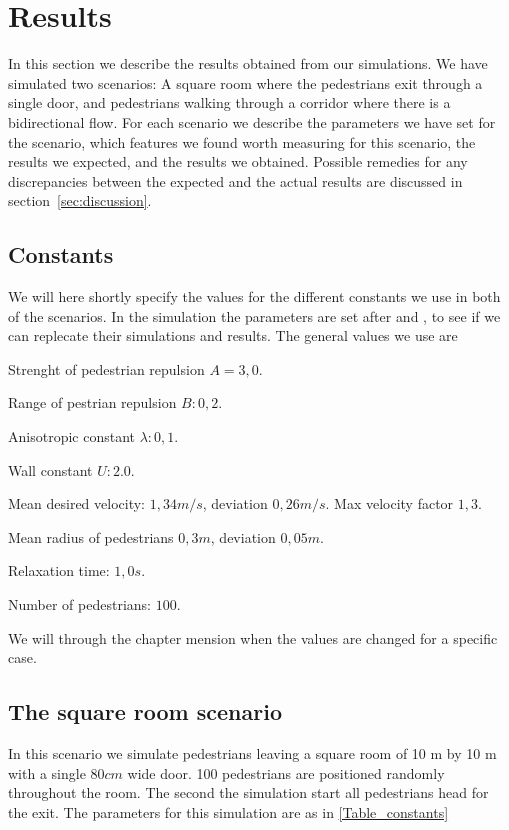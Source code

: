 \section{Results}
\label{sec:results}
In this section we describe the results obtained from our simulations. We have simulated two scenarios: A square room where the pedestrians exit through a single door, and pedestrians walking through a corridor where there is a bidirectional flow. For each scenario we describe the parameters we have set for the scenario, which features we found worth measuring for this scenario, the results we expected, and the results we obtained. Possible remedies for any discrepancies between the expected and the actual results are discussed in section~\ref{sec:discussion}.

\subsection{Constants}
We will here shortly specify the values for the different constants we use in both of the scenarios.
In the simulation the parameters are set after \cite{ABconstant} and \cite{self-org}, to see if we can replecate their simulations and results.
The general values we use are


\begin{itemize*}
    \item Strenght of pedestrian repulsion $A= 3,0$. 
    \item Range of pestrian repulsion $B: 0,2$.  
    \item Anisotropic constant $\lambda: 0,1$.
    \item Wall constant $U: 2.0$.
    \item Mean desired velocity: $1,34 m/s$, deviation $0,26 m/s$. Max velocity factor $1,3$.
    \item Mean radius of pedestrians $0,3 m$, deviation $0,05 m$.
    \item Relaxation time: $1,0 s$.
    \item Number of pedestrians: $100$.
\label{Table_constants}
\end{itemize*}

We will through the chapter mension when the values are changed for a specific case. 

\subsection{The square room scenario}
In this scenario we simulate pedestrians leaving a square room of 10 m by 10 m with a single $80cm$ wide door. 100 pedestrians are positioned randomly throughout the room. The second the simulation start all pedestrians head for the exit. The parameters for this simulation are as in \ref{Table_constants}

